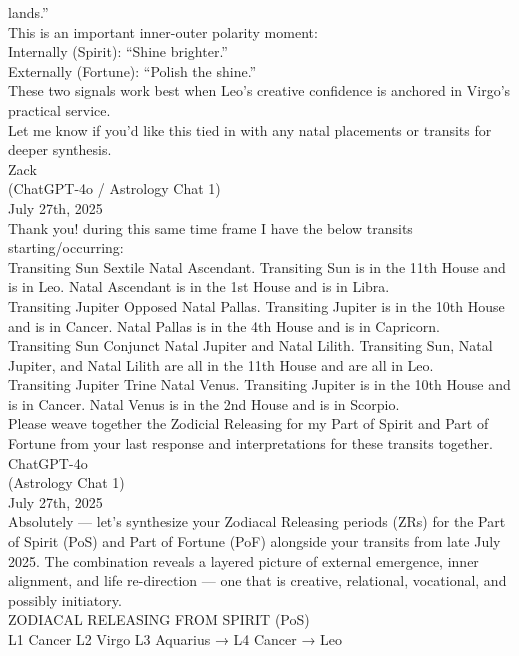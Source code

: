 \documentclass{article}
\begin{document}
lands.''\\
This is an important inner-outer polarity moment:\\
Internally (Spirit): ``Shine brighter.''\\
Externally (Fortune): ``Polish the shine.''\\
These two signals work best when Leo's creative confidence is anchored
in Virgo's practical service.\\
Let me know if you'd like this tied in with any natal placements or
transits for deeper synthesis.\\
Zack\\
(ChatGPT-4o / Astrology Chat 1)\\
July 27th, 2025\\
Thank you! during this same time frame I have the below transits
starting/occurring:\\
Transiting Sun Sextile Natal Ascendant. Transiting Sun is in the 11th
House and is in Leo. Natal Ascendant is in the 1st House and is in
Libra.\\
Transiting Jupiter Opposed Natal Pallas. Transiting Jupiter is in the
10th House and is in Cancer. Natal Pallas is in the 4th House and is in
Capricorn.\\
Transiting Sun Conjunct Natal Jupiter and Natal Lilith. Transiting Sun,
Natal Jupiter, and Natal Lilith are all in the 11th House and are all in
Leo.\\
Transiting Jupiter Trine Natal Venus. Transiting Jupiter is in the 10th
House and is in Cancer. Natal Venus is in the 2nd House and is in
Scorpio.\\
Please weave together the Zodicial Releasing for my Part of Spirit and
Part of Fortune from your last response and interpretations for these
transits together.\\
ChatGPT-4o\\
(Astrology Chat 1)\\
July 27th, 2025\\
Absolutely --- let's synthesize your Zodiacal Releasing periods (ZRs)
for the Part of Spirit (PoS) and Part of Fortune (PoF) alongside your
transits from late July 2025. The combination reveals a layered picture
of external emergence, inner alignment, and life re-direction --- one
that is creative, relational, vocational, and possibly initiatory.\\
 ZODIACAL RELEASING FROM SPIRIT (PoS)\\
L1 Cancer \textbar{} L2 Virgo \textbar{} L3 Aquarius → L4 Cancer → Leo\\
\end{document}
